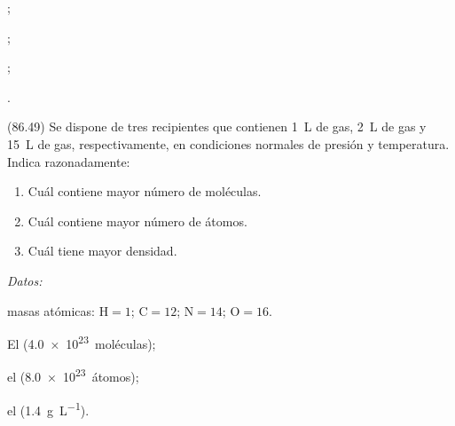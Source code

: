\documentclass[10pt,a5paper,twoside]{article}
\newenvironment{gexdatos}{
      \vspace{4pt}
      \noindent\small\textit{Datos:}
    }{\vspace{5pt}}
\begin{document}
  \begin{solution}
    \begin{enumerate*}
      \item {};
      \item {};
      \item {};
      \item {}.
    \end{enumerate*}
  \end{solution}




  \begin{exercise}[
      tags    = {},
      topics  = {química,química básica},
      source  = {FQ 1B MGH 2016, p86, e49},
    ]
    (86.49) Se dispone de tres recipientes que contienen \SI{1}{\liter} de  gas, \SI{2}{\liter} de  gas y \SI{15}{\liter} de  gas, respectivamente, en condiciones normales de presión y temperatura. Indica razonadamente:

    \begin{enumerate}
      \item Cuál contiene mayor número de moléculas.
      \item Cuál contiene mayor número de átomos.
      \item Cuál tiene mayor densidad.
    \end{enumerate}

    \begin{gexdatos}
      masas atómicas: \( \textrm{H} = 1 \); \( \textrm{C} = 12 \); \( \textrm{N} = 14 \); \( \textrm{O} = 16 \).
    \end{gexdatos}
  \end{exercise}

  \begin{solution}
    \begin{enumerate*}
      \item El  (\SI{4.0e23}{moléculas});
      \item el  (\SI{8.0e23}{átomos});
      \item el  (\SI{1.4}{\gram\per\liter}).
    \end{enumerate*}
  \end{solution}
\end{document}
